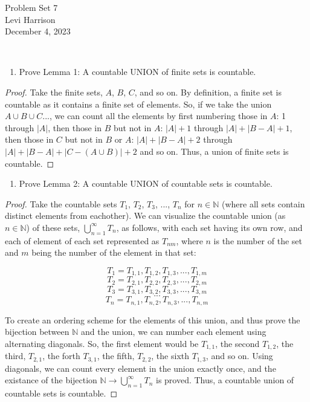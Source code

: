 \documentclass{article}
\begin{document}
\begin{center}
    \LARGE{Problem Set 7}\\[0.5em]
    \large{Levi Harrison}\\[0.5em]
    \small{December 4, 2023}
\end{center}

\,

\begin{enumerate}
    \item Prove Lemma 1: A countable UNION of finite sets is countable.
\end{enumerate}

\begin{proof}
    Take the finite sets, $A$, $B$, $C$, and so on. By definition, a finite set is countable as it contains a finite set of elements. So, if we take the union $A \cup B \cup C ...$, we can count all the elements by first numbering those in $A$: 1 through $|A|$, then those in $B$ but not in $A$: $|A|+ 1$ through $|A| + |B - A| + 1$, then those in $C$ but not in $B$ or $A$: $|A| + |B - A| + 2$ through $|A| + |B - A| + |C - (A \cup B)| + 2$ and so on. Thus, a union of finite sets is countable.
\end{proof}

\begin{enumerate}[resume]
    \item Prove Lemma 2: A countable UNION of countable sets is countable.
\end{enumerate}

\begin{proof}
    Take the countable sets $T_{1}$, $T_{2}$, $T_3$, ..., $T_n$ for $n \in \mathbb{N}$ (where all sets contain distinct elements from eachother). We can visualize the countable union (as $n \in \mathbb{N}$) of these sets, $\bigcup_{n = 1}^{\infty}T_n$, as follows, with each set having its own row, and each of element of each set represented as $T_{nm}$, where $n$ is the number of the set and $m$ being the number of the element in that set:

    \[T_1 = T_{1, 1}, T_{1, 2}, T_{1, 3}, ..., T_{1, m}\]
    \[T_2 = T_{2, 1}, T_{2, 2}, T_{2, 3}, ..., T_{2, m}\]
    \[T_3 = T_{3, 1}, T_{3, 2}, T_{3, 3}, ..., T_{3, m}\]
    \[...\]
    \[T_n = T_{n, 1}, T_{n, 2}, T_{n, 3}, ..., T_{n, m}\]

    To create an ordering scheme for the elements of this union, and thus prove the bijection between $\mathbb{N}$ and the union, we can number each element using alternating diagonals. So, the first element would be $T_{1, 1}$, the second $T_{1, 2}$, the third, $T_{2, 1}$, the forth $T_{3, 1}$, the fifth, $T_{2, 2}$, the sixth $T_{1, 3}$, and so on. Using diagonals, we can count every element in the union exactly once, and the existance of the bijection $\mathbb{N} \rightarrow \bigcup_{n = 1}^{\infty}T_n$ is proved. Thus, a countable union of countable sets is countable.
\end{proof}
\end{document}
